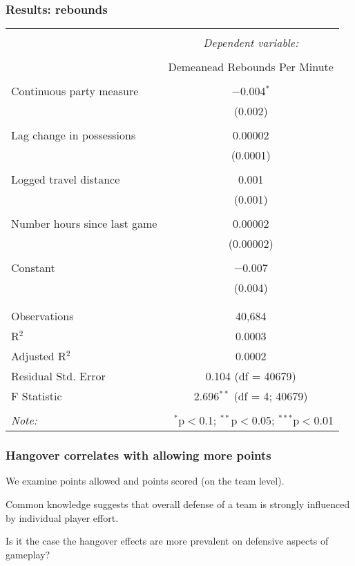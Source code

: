\documentclass{beamer}
\begin{document}
\begin{frame}   \frametitle{Results: rebounds}
  \centering
  \tiny{ %
\begin{tabular}{@{\extracolsep{5pt}}lc}  \\[-1.8ex]\hline  \hline \\[-1.8ex]   & \multicolumn{1}{c}{\textit{Dependent variable:}} \\  \cline{2-2}  \\[-1.8ex] & Demeanead Rebounds Per Minute \\  \hline \\[-1.8ex]   Continuous party measure & $-$0.004$^{*}$ \\    & (0.002) \\    & \\   Lag change in possessions & 0.00002 \\    & (0.0001) \\    & \\   Logged travel distance & 0.001 \\    & (0.001) \\    & \\   Number hours since last game & 0.00002 \\    & (0.00002) \\    & \\   Constant & $-$0.007 \\    & (0.004) \\    & \\  \hline \\[-1.8ex]  Observations & 40,684 \\  R$^{2}$ & 0.0003 \\  Adjusted R$^{2}$ & 0.0002 \\  Residual Std. Error & 0.104 (df = 40679) \\  F Statistic & 2.696$^{**}$ (df = 4; 40679) \\  \hline  \hline \\[-1.8ex]  \textit{Note:}  & \multicolumn{1}{r}{$^{*}$p$<$0.1; $^{**}$p$<$0.05; $^{***}$p$<$0.01} \\  \end{tabular}  } \end{frame}

\begin{frame}   \frametitle{Hangover correlates with allowing more points}
  We examine points allowed and points scored (on the team level).

  \vspace{12pt}Common knowledge suggests that overall defense of a team is strongly influenced by individual player effort.

  \vspace{12pt}Is it the case the hangover effects are more prevalent on defensive aspects of gameplay? \end{frame}
\end{document}
